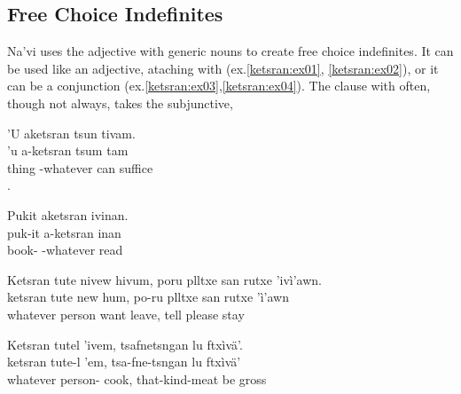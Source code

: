 \subsection{Free Choice Indefinites} Na'vi uses the adjective
  with generic nouns to
create free choice indefinites.  It can be used like an adjective,
ataching with  (ex.\ref{ketsran:ex01}, \ref{ketsran:ex02}), or
it can be a conjunction (ex.\ref{ketsran:ex03},\ref{ketsran:ex04}).
The clause with  often, though not always, takes the
subjunctive,

\begin{interlin} \label{ketsran:ex01}
\glll 'U aketsran tsun tivam. \\
     'u a-ketsran tsum tam \\
     thing -whatever can suffice \\
. \Ipawl{}
\end{interlin}

\begin{interlin} \label{ketsran:ex02}
\glll Pukit aketsran ivinan. \\
    puk-it a-ketsran inan \\
    book- -whatever read \\
 \Ipawl{}
\end{interlin}

\begin{interlin} \label{ketsran:ex03}
\glll Ketsran tute nivew hivum, poru plltxe san rutxe 'ivì'awn. \\
ketsran tute new hum, po-ru plltxe san rutxe 'ì'awn\\
whatever person want leave,  tell  please stay \\
 \Ipawl{}
\end{interlin}

\begin{interlin} \label{ketsran:ex04}
\glll Ketsran tutel 'ivem, tsafnetsngan lu ftxìvä'. \\
   ketsran tute-l 'em, tsa-fne-tsngan lu ftxìvä' \\
   whatever person- cook, that-kind-meat be gross \\
 \Ipawl{}
\end{interlin}


